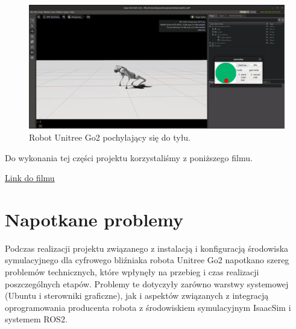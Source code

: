 \documentclass[12pt]{article}
\begin{document}
\begin{figure}[h]
    \centering
    \includegraphics[width=0.8\linewidth]{Zdjęcia/pochylenieTyl.png}
    \caption{Robot Unitree Go2 pochylający się do tyłu.}
    \label{fig:pochylenieTyl}
\end{figure}

Do wykonania tej części projektu korzystaliśmy z poniższego filmu.

\href{https://www.youtube.com/watch?v=L1rpxRm0Q1w&t=581s}{Link do filmu}

\clearpage

\section{Napotkane problemy}
Podczas realizacji projektu związanego z instalacją i konfiguracją środowiska symulacyjnego dla cyfrowego bliźniaka robota Unitree Go2 napotkano szereg problemów technicznych, które wpłynęły na przebieg i czas realizacji poszczególnych etapów. Problemy te dotyczyły zarówno warstwy systemowej (Ubuntu i sterowniki graficzne), jak i aspektów związanych z integracją oprogramowania producenta robota z środowiskiem symulacyjnym IsaacSim i systemem ROS2.\\
\end{document}
